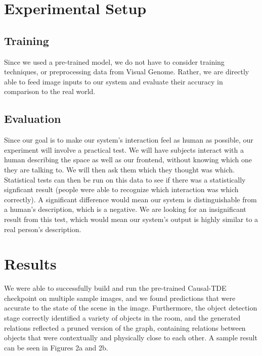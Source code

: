 \documentclass[letterpaper, 10 pt, conference]{ieeeconf}  %
\begin{document}
\section{Experimental Setup}
\subsection*{Training}
    Since we used a pre-trained model, we do not have to consider training techniques, or preprocessing data from Visual Genome. Rather, we are directly able to feed image inputs to our system and evaluate their accuracy in comparison to the real world.

\subsection*{Evaluation}

    Since our goal is to make our system's interaction feel as human as possible, our experiment will involve a practical test. We will have subjects interact with a human describing the space as well as our frontend, without knowing which one they are talking to. We will then ask them which they thought was which. Statistical tests can then be run on this data to see if there was a statistically signficant result (people were able to recognize which interaction was which correctly). A significant difference would mean our system is distinguishable from a human's description, which is a negative. We are looking for an insignificant result from this test, which would mean our system's output is highly similar to a real person's description. 


\section{Results}
    We were able to successfully build and run the pre-trained Causal-TDE checkpoint on multiple sample images, and we found predictions that were accurate to the state of the scene in the image. Furthermore, the object detection stage correctly identified a variety of objects in the room, and the generated relations reflected a pruned version of the graph, containing relations between objects that were contextually and physically close to each other. A sample result can be seen in Figures 2a and 2b.
\end{document}

